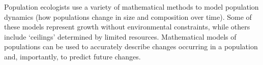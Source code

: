 Population ecologists use a variety of mathematical methods to model population dynamics (how populations change in size and composition over time).
Some of these models represent growth without environmental constraints, while others include `ceilings' determined by limited resources.
Mathematical models of populations can be used to accurately describe changes occurring in a population and, importantly, to predict future changes.
